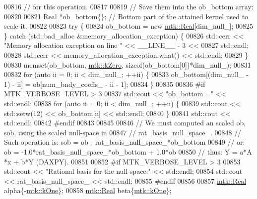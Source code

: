 \begin{DoxyCode}
{{00816     \textcolor{comment}{// for this operation.}
00817 
00819     \textcolor{comment}{// Save them into the ob\_bottom array:}
00820 
00821     \hyperlink{group__c01-roots_gac080bbbf5cbb5502c9f00405f894857d}{Real} *ob\_bottom\{\}; \textcolor{comment}{// Bottom part of the attained kernel used to scale it.}
00822 
00823     \textcolor{keywordflow}{try} \{
00824       ob\_bottom = \textcolor{keyword}{new} \hyperlink{group__c01-roots_gac080bbbf5cbb5502c9f00405f894857d}{mtk::Real}[dim\_null\_];
00825     \} \textcolor{keywordflow}{catch} (std::bad\_alloc &memory\_allocation\_exception) \{
00826       std::cerr << \textcolor{stringliteral}{"Memory allocation exception on line "} << \_\_LINE\_\_ - 3 <<
00827         std::endl;
00828       std::cerr << memory\_allocation\_exception.what() << std::endl;
00829     \}
00830     memset(ob\_bottom, \hyperlink{group__c01-roots_ga59a451a5fae30d59649bcda274fea271}{mtk::kZero}, \textcolor{keyword}{sizeof}(ob\_bottom[0])*dim\_null\_);
00831 
00832     \textcolor{keywordflow}{for} (\textcolor{keyword}{auto} ii = 0; ii < dim\_null\_; ++ii) \{
00833       ob\_bottom[(dim\_null\_ - 1) - ii] = ob[num\_bndy\_coeffs\_ - ii - 1];
00834     \}
00835 
00836 \textcolor{preprocessor}{    #if MTK\_VERBOSE\_LEVEL > 3}
00837     std::cout << \textcolor{stringliteral}{"ob\_bottom ="} << std::endl;
00838     \textcolor{keywordflow}{for} (\textcolor{keyword}{auto} ii = 0; ii < dim\_null\_; ++ii) \{
00839       std::cout << std::setw(12) << ob\_bottom[ii] << std::endl;
00840     \}
00841     std::cout << std::endl;
00842 \textcolor{preprocessor}{    #endif}
00843 
00845 
00846     \textcolor{comment}{// We must computed an scaled ob, sob, using the scaled null-space in}
00847     \textcolor{comment}{// rat\_basis\_null\_space\_.}
00848     \textcolor{comment}{// Such operation is: sob = ob - rat\_basis\_null\_space\_*ob\_bottom}
00849     \textcolor{comment}{// or:                 ob = -1.0*rat\_basis\_null\_space\_*ob\_bottom + 1.0*ob}
00850     \textcolor{comment}{// thus:                Y =    a*A    *x         +   b*Y (DAXPY).}
00851 
00852 \textcolor{preprocessor}{    #if MTK\_VERBOSE\_LEVEL > 3}
00853     std::cout << \textcolor{stringliteral}{"Rational basis for the null-space:"} << std::endl;
00854     std::cout << rat\_basis\_null\_space\_ << std::endl;
00855 \textcolor{preprocessor}{    #endif}
00856 
00857     \hyperlink{group__c01-roots_gac080bbbf5cbb5502c9f00405f894857d}{mtk::Real} alpha\{-\hyperlink{group__c01-roots_ga26407c24d43b6b95480943340d285c71}{mtk::kOne}\};
00858     \hyperlink{group__c01-roots_gac080bbbf5cbb5502c9f00405f894857d}{mtk::Real} beta\{\hyperlink{group__c01-roots_ga26407c24d43b6b95480943340d285c71}{mtk::kOne}\};
}}
\end{DoxyCode}
